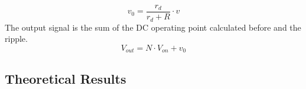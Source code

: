 \[
v_0 = \frac{r_d}{r_d+R}\cdot v
\]
The output signal is the sum of the DC operating point calculated before and the ripple.
\[
V_{out}=N \cdot V_{on} + v_0
\]


\subsection{Theoretical Results}
\label{subsec:res_the}



